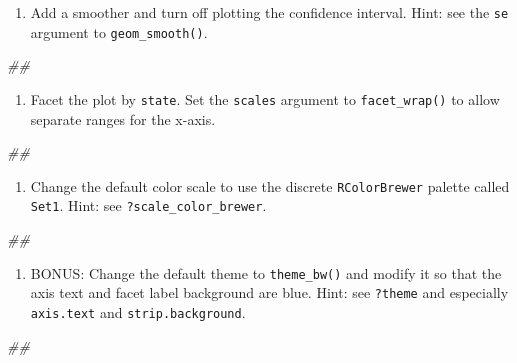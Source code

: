 \documentclass[]{book}
\newenvironment{Shaded}{\begin{snugshade}}{\end{snugshade}}
\newcommand{\CommentTok}[1]{\textcolor[rgb]{0.56,0.35,0.01}{\textit{#1}}}
\providecommand{\tightlist}{%
  \setlength{\itemsep}{0pt}\setlength{\parskip}{0pt}}
\begin{document}
\begin{enumerate}
\def\labelenumi{\arabic{enumi}.}
\setcounter{enumi}{2}
\tightlist
\item
  Add a smoother and turn off plotting the confidence interval. Hint: see the \texttt{se} argument to \texttt{geom\_smooth()}.
\end{enumerate}

\begin{Shaded}
\begin{Highlighting}[]
\CommentTok{## }
\end{Highlighting}
\end{Shaded}

\begin{enumerate}
\def\labelenumi{\arabic{enumi}.}
\setcounter{enumi}{3}
\tightlist
\item
  Facet the plot by \texttt{state}. Set the \texttt{scales} argument to \texttt{facet\_wrap()} to allow separate ranges for the x-axis.
\end{enumerate}

\begin{Shaded}
\begin{Highlighting}[]
\CommentTok{## }
\end{Highlighting}
\end{Shaded}

\begin{enumerate}
\def\labelenumi{\arabic{enumi}.}
\setcounter{enumi}{4}
\tightlist
\item
  Change the default color scale to use the discrete \texttt{RColorBrewer} palette called \texttt{Set1}. Hint: see \texttt{?scale\_color\_brewer}.
\end{enumerate}

\begin{Shaded}
\begin{Highlighting}[]
\CommentTok{## }
\end{Highlighting}
\end{Shaded}

\begin{enumerate}
\def\labelenumi{\arabic{enumi}.}
\setcounter{enumi}{5}
\tightlist
\item
  BONUS: Change the default theme to \texttt{theme\_bw()} and modify it so that the axis text and facet label background are blue. Hint: see \texttt{?theme} and especially \texttt{axis.text} and \texttt{strip.background}.
\end{enumerate}

\begin{Shaded}
\begin{Highlighting}[]
\CommentTok{## }
\end{Highlighting}
\end{Shaded}
\end{document}
